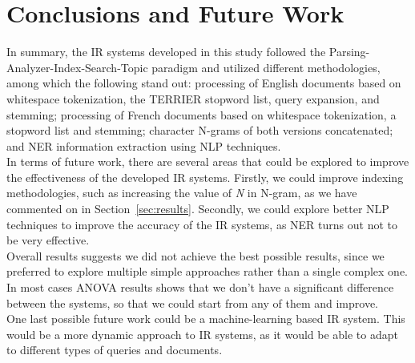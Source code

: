\section{Conclusions and Future Work}
\label{sec:conclusion}

In summary, the IR systems developed in this study followed the Parsing-Analyzer-Index-Search-Topic paradigm and utilized different methodologies, among which the following stand out: processing of English documents based on whitespace tokenization, the TERRIER stopword list, query expansion, and stemming; processing of French documents based on whitespace tokenization, a stopword list and stemming; character N-grams of both versions concatenated; and NER information extraction using NLP techniques.\\

In terms of future work, there are several areas that could be explored to improve the effectiveness of the developed IR systems. Firstly, we could improve indexing methodologies, such as increasing the value of \textit{N} in N-gram, as we have commented on in Section~\ref{sec:results}. Secondly, we could explore better NLP techniques to improve the accuracy of the IR systems, as NER turns out not to be very effective.\\

Overall results suggests we did not achieve the best possible results, since we preferred to explore multiple simple approaches rather than a single complex one. In most cases ANOVA results shows that we don't have a significant difference between the systems, so that we could start from any of them and improve.\\

One last possible future work could be a machine-learning based IR system. This would be a more dynamic approach to IR systems, as it would be able to adapt to different types of queries and documents.